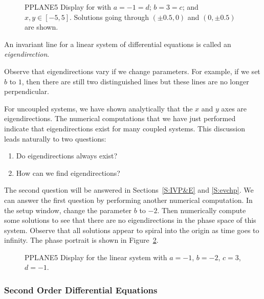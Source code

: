 \begin{figure}[htb]
     \centerline{%
     }
     \caption{{\sf PPLANE5 Display} for \protect{} with
             $a=-1=d$; $b=3=c$; and $x,y\in [-5,5]$.
	Solutions going through $(\pm 0.5,0)$ and $(0,\pm 0.5)$ are shown.}
     \label{F:invariantlines}
\end{figure}

\begin{Def} \label{D:eigendirection}
An invariant line for a linear system of differential equations
is called an {\em eigendirection}.
\end{Def}

Observe that eigendirections vary if we change parameters.  For
example, if we set $b$ to $1$, then there are still two
distinguished lines but these lines are no longer perpendicular.

For uncoupled systems, we have shown analytically that the $x$
and $y$ axes are eigendirections.  The numerical computations
that we have just performed indicate that eigendirections exist
for many coupled systems.  This discussion leads naturally to
two questions:
\begin{enumerate}
\item Do eigendirections always exist?
\item How can we find eigendirections?
\end{enumerate}
The second question will be answered in Sections~\ref{S:IVP&E} and 
\ref{S:evchp}.  We can answer the first question by performing another 
numerical computation.  In the setup window, change the parameter $b$ 
to $-2$.  Then numerically compute some solutions to see that there
are no eigendirections in the phase space of this system.  Observe that
all solutions appear to spiral into the origin as time goes to
infinity.  The phase portrait is shown in Figure~\ref{pp_dsp2}.
\begin{figure}[htb]
      \centerline{%
      }
      \caption{{\sf PPLANE5 Display} for the {\sf linear system}
		with $a=-1$, $b=-2$, $c=3$, $d=-1$.}
      \label{pp_dsp2}
\end{figure}

\subsubsection*{Second Order Differential Equations}

